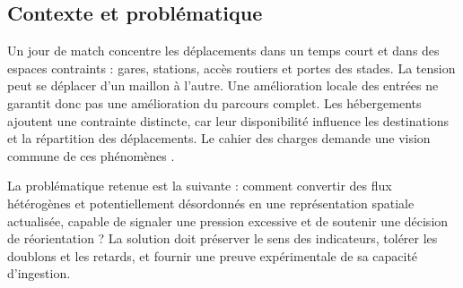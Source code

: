 \documentclass[a4paper,11pt]{article}
\begin{document}
\subsection{Contexte et problématique}
Un jour de match concentre les déplacements dans un temps court et dans des espaces contraints : gares, stations, accès routiers et portes des stades. La tension peut se déplacer d'un maillon à l'autre. Une amélioration locale des entrées ne garantit donc pas une amélioration du parcours complet. Les hébergements ajoutent une contrainte distincte, car leur disponibilité influence les destinations et la répartition des déplacements. Le cahier des charges demande une vision commune de ces phénomènes \cite{ref1}.
\par
La problématique retenue est la suivante : comment convertir des flux hétérogènes et potentiellement désordonnés en une représentation spatiale actualisée, capable de signaler une pression excessive et de soutenir une décision de réorientation ? La solution doit préserver le sens des indicateurs, tolérer les doublons et les retards, et fournir une preuve expérimentale de sa capacité d'ingestion.
\par
\end{document}
